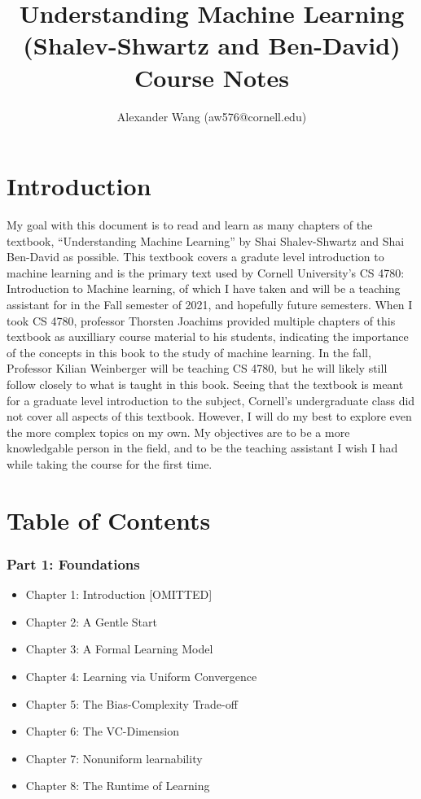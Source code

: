 \documentclass{article}
\title{Understanding Machine Learning (Shalev-Shwartz and Ben-David) \\ \large{Course Notes}}
\author{Alexander Wang (aw576@cornell.edu)}
\begin{document}
\maketitle

\part*{Introduction}

My goal with this document is to read and learn as many chapters of the textbook, ``Understanding Machine Learning'' by Shai Shalev-Shwartz and Shai Ben-David as possible. This textbook covers a gradute level introduction to machine learning and is the primary text used by Cornell University's CS 4780: Introduction to Machine learning, of which I have taken and will be a teaching assistant for in the Fall semester of 2021, and hopefully future semesters. When I took CS 4780, professor Thorsten Joachims provided multiple chapters of this textbook as auxilliary course material to his students, indicating the importance of the concepts in this book to the study of machine learning. In the fall, Professor Kilian Weinberger will be teaching CS 4780, but he will likely still follow closely to what is taught in this book. Seeing that the textbook is meant for a graduate level introduction to the subject, Cornell's undergraduate class did not cover all aspects of this textbook. However, I will do my best to explore even the more complex topics on my own. My objectives are to be a more knowledgable person in the field, and to be the teaching assistant I wish I had while taking the course for the first time.

\part*{Table of Contents}
\section*{Part 1: Foundations}
\begin{itemize}
  \item Chapter 1: Introduction [OMITTED]
  \item Chapter 2: A Gentle Start
  \item Chapter 3: A Formal Learning Model
  \item Chapter 4: Learning via Uniform Convergence
  \item Chapter 5: The Bias-Complexity Trade-off
  \item Chapter 6: The VC-Dimension
  \item Chapter 7: Nonuniform learnability
  \item Chapter 8: The Runtime of Learning
\end{itemize}
\end{document}
